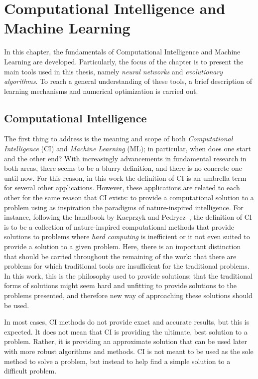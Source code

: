 \chapter{Computational Intelligence and Machine Learning}
\label{Cap3}

In this chapter, the fundamentals of Computational Intelligence and Machine Learning 
are developed. Particularly, the focus of the chapter is to present the main tools 
used in this thesis, namely \emph{neural networks} and \emph{evolutionary algorithms}. To 
reach a general understanding of these tools, a brief description of learning mechanisms
and numerical optimization is carried out.

\section{Computational Intelligence}
The first thing to address is the meaning and scope of both \emph{Computational 
Intelligence} (CI) and \emph{Machine Learning} (ML); in particular, when does one start
and the other end? With increasingly advancements in fundamental research in both areas,
there seems to be a blurry definition, and there is no concrete one until now. For this 
reason, in this work the definition of CI is an umbrella term for several other 
applications. However, these applications are related to each other for the same reason
that CI exists: to provide a computational solution to a problem using as inspiration
the paradigms of nature-inspired intelligence. For instance, following the handbook
by Kacprzyk and Pedrycz~\cite{kacprzykSpringerHandbookComputational2015},
the definition of CI is to be a collection of nature-inspired computational methods that
provide solutions to problems where \emph{hard computing} is inefficient or it not even
suited to provide a solution to a given problem. Here, there is an important distinction
that should be carried throughout the remaining of the work: that there are problems for
which traditional tools are insufficient for the traditional problems. In this work, this
is the philosophy used to provide solutions: that the traditional forms of solutions might
seem hard and unfitting to provide solutions to the problems presented, and therefore
new way of approaching these solutions should be used.

In most cases, CI methods do not provide exact and accurate results, but this is expected.
It does not mean that CI is providing the ultimate, best solution to a problem. Rather, it 
is providing an approximate solution that can be used later with more robust algorithms and
methods. CI is not meant to be used as the sole method to solve a problem, but instead to
help find a simple solution to a difficult problem.